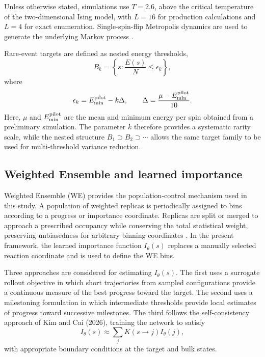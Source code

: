 \documentclass[a4paper,fleqn]{cas-sc}
\let\Oldsubsection\subsection
\renewcommand{\subsection}{\FloatBarrier\Oldsubsection}
\begin{document}
	Unless otherwise stated, simulations use $T=2.6$, above the critical temperature of the two-dimensional Ising model, with $L=16$ for production calculations and $L=4$ for exact enumeration. Single-spin-flip Metropolis dynamics are used to generate the underlying Markov process \cite{metropolis1953}.
	
	Rare-event targets are defined as nested energy thresholds,
	\begin{equation}
		B_k=
		\left\{
		s:\frac{E(s)}{N}\leq\epsilon_k
		\right\},
	\end{equation}
	where
	\begin{equation}
		\epsilon_k=E_{\min}^{\rm pilot}-k\Delta,
		\qquad
		\Delta=\frac{\mu-E_{\min}^{\rm pilot}}{10}.
		\label{eq:beyond}
	\end{equation}
	Here, $\mu$ and $E_{\min}^{\rm pilot}$ are the mean and minimum energy per spin obtained from a preliminary simulation. The parameter $k$ therefore provides a systematic rarity scale, while the nested structure
	$B_1\supset B_2\supset\cdots$
	allows the same target family to be used for multi-threshold variance reduction.
	
	\subsection{Weighted Ensemble and learned importance}\label{sec:we}
	
	Weighted Ensemble (WE) provides the population-control mechanism used in this study. A population of weighted replicas is periodically assigned to bins according to a progress or importance coordinate. Replicas are split or merged to approach a prescribed occupancy while conserving the total statistical weight, preserving unbiasedness for arbitrary binning coordinates \cite{huber1996,zhang2010}. In the present framework, the learned importance function $I_\theta(s)$ replaces a manually selected reaction coordinate and is used to define the WE bins.
	
	Three approaches are considered for estimating $I_\theta(s)$. The first uses a surrogate rollout objective in which short trajectories from sampled configurations provide a continuous measure of the best progress toward the target. The second uses a milestoning formulation in which intermediate thresholds provide local estimates of progress toward successive milestones. The third follows the self-consistency approach of Kim and Cai (2026), training the network to satisfy
	\begin{equation}
		I_\theta(s)\approx\sum_jK(s\rightarrow j)I_\theta(j),
	\end{equation}
	with appropriate boundary conditions at the target and bulk states.
	
\end{document}
